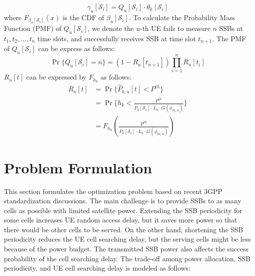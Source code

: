 \begin{equation}
    \gamma_u[\mathcal{S}_i] = Q_u[\mathcal{S}_i] \cdot \theta_k[\mathcal{S}_i]
\end{equation}
where $F_{\beta_u[\mathcal{S}_i]}(x)$ is the CDF of $\beta_u[\mathcal{S}_i]$. To calculate the Probability Mass Function (PMF) of $Q_u[\mathcal{S}_i]$, we denote the $u$-th UE fails to measure $n$ SSBs at $t_1, t_2, \ldots, t_n$ time slots, and successfully receives SSB at time slot $t_{n+1}$. The PMF of $Q_u[\mathcal{S}_i]$ can be express as follows: 
\begin{equation}
    \Pr\{Q_u[\mathcal{S}_i] = n\} = (1 - R_u[t_{n+1}]) \prod_{i=1}^n R_u[t_i]
\end{equation}
$R_u[t]$ can be expressed by $F_{h_k}$ as follows:
\begin{equation}
    \begin{aligned}
        R_u[t]
        &= \Pr\{\hat{P}_{k, u}[t] < P^{th}\} \\
        &= \Pr\{h_k < \frac{P^{th}}{P_k[\mathcal{S}_i] \cdot L_k \cdot G(\phi_{m, u})}\} \\
        &= F_{h_k}(\frac{P^{th}}{P_k[\mathcal{S}_i] \cdot L_k \cdot G(\phi_{m, u})})
    \end{aligned} \label{eq:Ru}
\end{equation}


\section{Problem Formulation}
This section formulates the optimization problem based on recent 3GPP standardization discussions. The main challenge is to provide SSBs to as many cells as possible with limited satellite power. Extending the SSB periodicity for some cells increases UE random access delay, but it saves more power so that there would be other cells to be served. On the other hand, shortening the SSB periodicity reduces the UE cell searching delay, but the serving cells might be less because of the power budget. The transmitted SSB power also affects the success probability of the cell searching delay. The trade-off among power allocation, SSB periodicity, and UE cell searching delay is modeled as follows:

